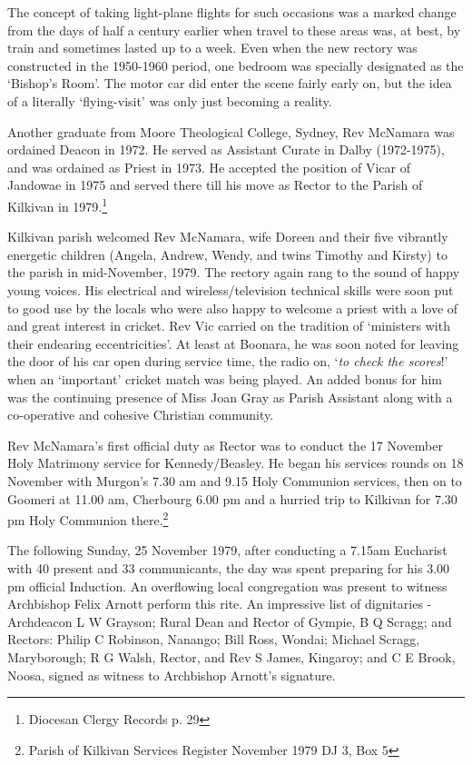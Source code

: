 The concept of taking light-plane flights for such occasions was a marked change from the days of half a century earlier when travel to these areas was, at best, by train and sometimes lasted up to a week. Even when the new rectory was constructed in the 1950-1960 period, one bedroom was specially designated as the `Bishop's Room'. The motor car did enter the scene fairly early on, but the idea of a literally `flying-visit' was only just becoming a reality.

Another graduate from Moore Theological College, Sydney, Rev McNamara was ordained Deacon in 1972. He served as Assistant Curate in Dalby (1972-1975), and was ordained as Priest in 1973. He accepted the position of Vicar of Jandowae in 1975 and served there till his move as Rector to the Parish of Kilkivan in 1979.\footnote{Diocesan Clergy Records p. 29}

Kilkivan parish welcomed Rev McNamara, wife Doreen and their five vibrantly energetic children (Angela, Andrew, Wendy, and twins Timothy and Kirsty) to the parish in mid-November, 1979. The rectory again rang to the sound of happy young voices. His electrical and wireless/television technical skills were soon put to good use by the locals who were also happy to welcome a priest with a love of and great interest in cricket. Rev Vic carried on the tradition of `ministers with their endearing eccentricities'. At least at Boonara, he was soon noted for leaving the door of his car open during service time, the radio on, `\emph{to check the scores}!' when an `important' cricket match was being played. An added bonus for him was the continuing presence of Miss Joan Gray as Parish Assistant along with a co-operative and cohesive Christian community.

Rev McNamara's first official duty as Rector was to conduct the 17 November Holy Matrimony service for Kennedy/Beasley. He began his services rounds on 18 November with Murgon's 7.30 am and 9.15 Holy Communion services, then on to Goomeri at 11.00 am, Cherbourg 6.00 pm and a hurried trip to Kilkivan for 7.30 pm Holy Communion there.\footnote{Parish of Kilkivan Services Register November 1979 DJ 3, Box 5}

The following Sunday, 25 November 1979, after conducting a 7.15am Eucharist with 40 present and 33 communicants, the day was spent preparing for his 3.00 pm official Induction. An overflowing local congregation was present to witness Archbishop Felix Arnott perform this rite. An impressive list of dignitaries - Archdeacon L W Grayson; Rural Dean and Rector of Gympie, B Q Scragg; and Rectors: Philip C Robinson, Nanango; Bill Ross, Wondai; Michael Scragg, Maryborough; R G Walsh, Rector, and Rev S James, Kingaroy; and C E Brook, Noosa, signed as witness to Archbishop Arnott's signature.

